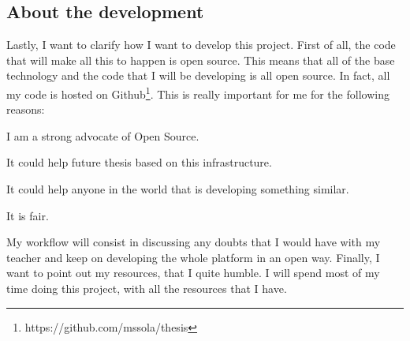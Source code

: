 \mylistend

\subsection{About the development}

Lastly, I want to clarify how I want to develop this project. First of all, the
code that will make all this to happen is open source. This means that all of
the base technology and the code that I will be developing is all open source.
In fact, all my code is hosted on
Github\footnote{https://github.com/mssola/thesis}. This is really important for
me for the following reasons:

\mylist
  \item I am a strong advocate of Open Source.
  \item It could help future thesis based on this infrastructure.
  \item It could help anyone in the world that is developing something similar.
  \item It is fair.
\mylistend

My workflow will consist in discussing any doubts that I would have with my
teacher and keep on developing the whole platform in an open way. Finally, I
want to point out my resources, that I quite humble. I will spend most of my
time doing this project, with all the resources that I have.

